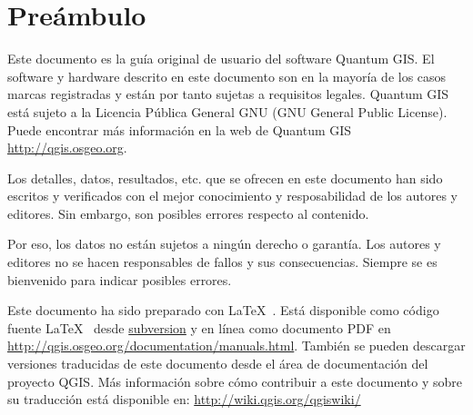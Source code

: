 
\newcommand\qgistip[1]{\raggedright\small{#1}}
\renewcommand{\topfraction}{0.85}
\renewcommand{\textfraction}{0.1}
\renewcommand{\floatpagefraction}{0.75}

\thispagestyle{empty}


\section*{Preámbulo}


Este documento es la guía original de usuario del 
software Quantum GIS. El software y hardware descrito en este  
documento son en la mayoría de los casos marcas registradas y están por tanto sujetas  
a requisitos legales. Quantum GIS está sujeto a la Licencia Pública General GNU (GNU General Public 
License). Puede encontrar más información en la web de Quantum GIS
\url{http://qgis.osgeo.org}.

Los detalles, datos, resultados, etc. que se ofrecen en este documento han sido 
escritos y verificados con el mejor conocimiento y resposabilidad de los autores y
editores. Sin embargo, son posibles errores respecto al contenido.

Por eso, los datos no están sujetos a ningún derecho o garantía. Los autores y editores 
no se hacen responsables de fallos y 
sus consecuencias. Siempre se es bienvenido para indicar posibles errores.

Este documento ha sido preparado con \LaTeX~. Está disponible como código fuente \LaTeX~
desde \href{http://wiki.qgis.org/qgiswiki/DocumentationWritersCorner}{subversion} 
y en línea como documento PDF en \url{http://qgis.osgeo.org/documentation/manuals.html}. 
También se pueden descargar versiones traducidas de este documento desde el área de documentación 
del proyecto QGIS. Más información sobre cómo contribuir a este documento y sobre 
su traducción está disponible en: \url{http://wiki.qgis.org/qgiswiki/} 

\vspace{0.5cm}

